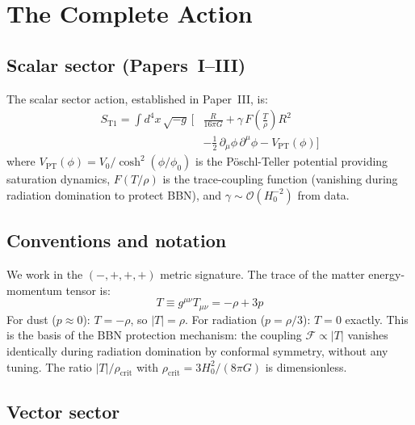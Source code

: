 \documentclass[aps,prd,twocolumn,superscriptaddress,nofootinbib]{revtex4-2}
\begin{document}
\section{The Complete Action}
\label{sec:action}

\subsection{Scalar sector (Papers~I--III)} %

The scalar sector action, established in Paper~III, is:
\begin{align}
S_{\mathrm{T1}} = \int d^4x\,\sqrt{-g}\,\bigg[&
  \frac{R}{16\pi G}
  + \gamma\,F\!\left(\frac{T}{\rho}\right) R^2
\nonumber \\
  &- \frac{1}{2}\,\partial_\mu\phi\,\partial^\mu\phi
  - V_{\mathrm{PT}}(\phi)
\bigg]
\label{eq:S_T1}
\end{align}
where $V_{\mathrm{PT}}(\phi) = V_0/\cosh^2(\phi/\phi_0)$ is the P\"oschl-Teller potential providing saturation dynamics, $F(T/\rho)$ is the trace-coupling function (vanishing during radiation domination to protect BBN), and $\gamma \sim \mathcal{O}(H_0^{-2})$ from data.

\subsection{Conventions and notation}
\label{sec:conventions}

We work in the $(-,+,+,+)$ metric signature. The trace of the matter energy-momentum tensor is:
\begin{equation}
T \equiv g^{\mu\nu}T_{\mu\nu} = -\rho + 3p
\label{eq:trace_def}
\end{equation}
For dust ($p \approx 0$): $T = -\rho$, so $|T| = \rho$. For radiation ($p = \rho/3$): $T = 0$ exactly. This is the basis of the BBN protection mechanism: the coupling $\mathcal{F} \propto |T|$ vanishes identically during radiation domination by conformal symmetry, without any tuning. The ratio $|T|/\rho_{\mathrm{crit}}$ with $\rho_{\mathrm{crit}} = 3H_0^2/(8\pi G)$ is dimensionless.

\subsection{Vector sector} %
\label{sec:vector_action}
\end{document}
